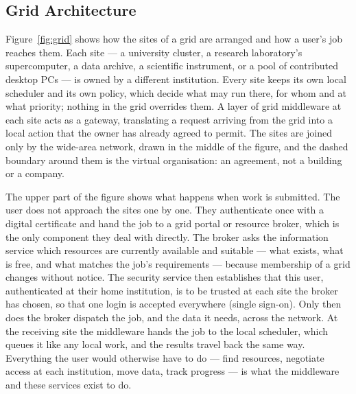 \documentclass[../main.tex]{subfiles}
\begin{document}
\subsection{Grid Architecture}

Figure~\ref{fig:grid} shows how the sites of a grid are arranged and how a
user's job reaches them. Each site --- a university cluster, a research
laboratory's supercomputer, a data archive, a scientific instrument, or a pool
of contributed desktop PCs --- is owned by a different institution. Every site
keeps its own local scheduler and its own policy, which decide what may run
there, for whom and at what priority; nothing in the grid overrides them. A
layer of grid middleware at each site acts as a gateway, translating a request
arriving from the grid into a local action that the owner has already agreed
to permit. The sites are joined only by the wide-area network, drawn in the
middle of the figure, and the dashed boundary around them is the virtual
organisation: an agreement, not a building or a company.

The upper part of the figure shows what happens when work is submitted. The
user does not approach the sites one by one. They authenticate once with a
digital certificate and hand the job to a grid portal or resource broker,
which is the only component they deal with directly. The broker asks the
information service which resources are currently available and suitable ---
what exists, what is free, and what matches the job's requirements --- because
membership of a grid changes without notice. The security service then
establishes that this user, authenticated at their home institution, is to be
trusted at each site the broker has chosen, so that one login is accepted
everywhere (single sign-on). Only then does the broker dispatch the job, and
the data it needs, across the network. At the receiving site the middleware
hands the job to the local scheduler, which queues it like any local work, and
the results travel back the same way. Everything the user would otherwise have
to do --- find resources, negotiate access at each institution, move data,
track progress --- is what the middleware and these services exist to do.
\end{document}
